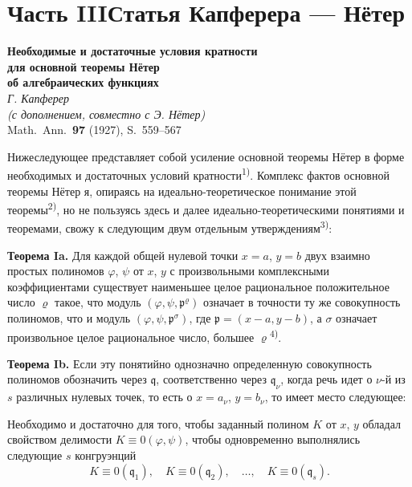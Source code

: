 \documentclass[11pt]{article}
\newcommand{\foreign}[1]{#1}
\theoremstyle{plain}
\begin{document}
\newpage
\part*{Часть III\hspace{1em}Статья Капферера --- Нётер}

\begin{center}
\Large\textbf{Необходимые и достаточные условия кратности}\\[0.3em]
\Large\textbf{для основной теоремы Нётер}\\[0.5em]
\large\textbf{об алгебраических функциях}\\[1em]
\normalsize\textit{Г. Капферер}\\[0.5em]
\small\textit{(с дополнением, совместно с Э. Нётер)}\\[1em]
\normalsize \foreign{Math.\ Ann.}\ \textbf{97} (1927), S.~559--567
\end{center}

\vspace{1em}

Нижеследующее представляет собой усиление основной теоремы Нётер
в форме необходимых и достаточных условий кратности\textsuperscript{1)}.
Комплекс фактов основной теоремы Нётер я, опираясь на
идеально-теоретическое понимание этой теоремы\textsuperscript{2)},
но не пользуясь здесь и далее идеально-теоретическими понятиями и
теоремами, свожу к следующим двум отдельным утверждениям\textsuperscript{3)}:

\smallskip
\textbf{Теорема Ia.} Для каждой общей нулевой точки $x = a$,
$y = b$ двух взаимно простых полиномов $\varphi$, $\psi$ от $x$, $y$
с произвольными комплексными коэффициентами существует наименьшее
целое рациональное положительное число $\varrho$ такое, что модуль
$(\varphi, \psi, \mathfrak{p}^{\varrho})$ означает в точности ту же
совокупность полиномов, что и модуль
$(\varphi, \psi, \mathfrak{p}^{\sigma})$, где
$\mathfrak{p} = (x-a, y-b)$, а $\sigma$ означает произвольное целое
рациональное число, большее $\varrho$\textsuperscript{4)}.

\smallskip
\textbf{Теорема Ib.} Если эту понятийно однозначно определенную
совокупность полиномов обозначить через $\mathfrak{q}$, соответственно
через $\mathfrak{q}_{\nu}$, когда речь идет о $\nu$-й из $s$ различных
нулевых точек, то есть о $x = a_{\nu}$, $y = b_{\nu}$, то имеет место
следующее:

Необходимо и достаточно для того, чтобы заданный полином $K$ от
$x$, $y$ обладал свойством делимости
$K \equiv 0(\varphi, \psi)$, чтобы одновременно выполнялись следующие
$s$ конгруэнций
\[
K \equiv 0(\mathfrak{q}_{1}), \quad K \equiv 0(\mathfrak{q}_{2}), \quad\ldots,\quad
K \equiv 0(\mathfrak{q}_{s}).
\]
\end{document}
